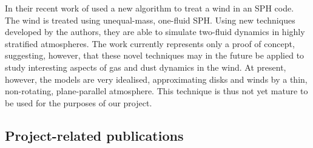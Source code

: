 \documentclass[10pt,fleqn,twoside]{article}
\begin{document}
In their recent work of \citet{2016MNRAS.463.2725H, 
2016MNRAS.461..742H} used a new algorithm to
treat a wind in an SPH code. The wind is treated using unequal-mass, one-fluid SPH. Using new techniques
developed by the authors, they are able to simulate two-fluid dynamics
in highly stratified atmospheres. The work currently represents 
only a proof of concept, suggesting, however, that these novel
techniques may in the future be applied to study interesting aspects of gas and dust
dynamics in the wind. At present, however, the models are very
idealised, approximating disks and winds by a thin, non-rotating,
plane-parallel atmosphere.  This technique is thus not yet mature to
be used for the purposes of our project.


\subsection{Project-related publications}


\end{document}
